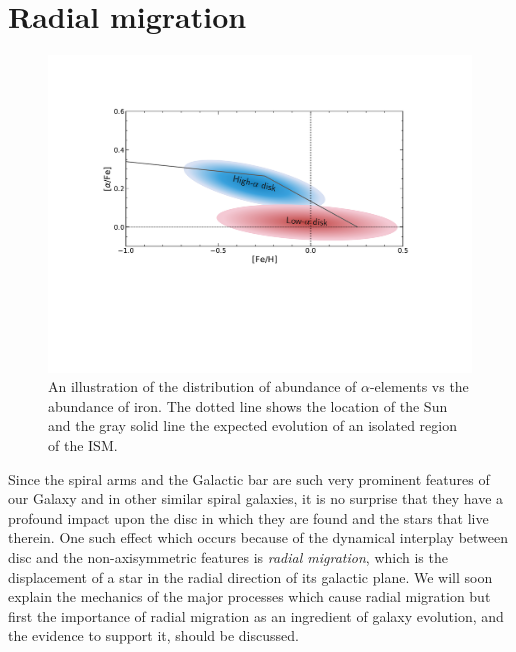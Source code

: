 \section{Radial migration}\label{sec:migration}
\begin{figure}[t]
    \centering
    \includegraphics[width=.9\textwidth]{images/alphaoverfe.pdf}
    \caption{An illustration of the distribution of abundance of $\alpha$-elements vs the abundance of iron. The dotted line shows the location of the Sun and the gray solid line the expected evolution of an isolated region of the ISM.} %
    \label{fig:alphaoverfe}
\end{figure}
Since the spiral arms and the Galactic bar are such very prominent features of our Galaxy and in other similar spiral galaxies, it is no surprise that they have a profound impact upon the disc in which they are found and the stars that live therein. One such effect which occurs because of the dynamical interplay between disc and the non-axisymmetric features is \textit{radial migration}, which is the displacement of a star in the radial direction of its galactic plane. We will soon explain the mechanics of the major processes which cause radial migration but first the importance of radial migration as an ingredient of galaxy evolution, and the evidence to support it, should be discussed.

